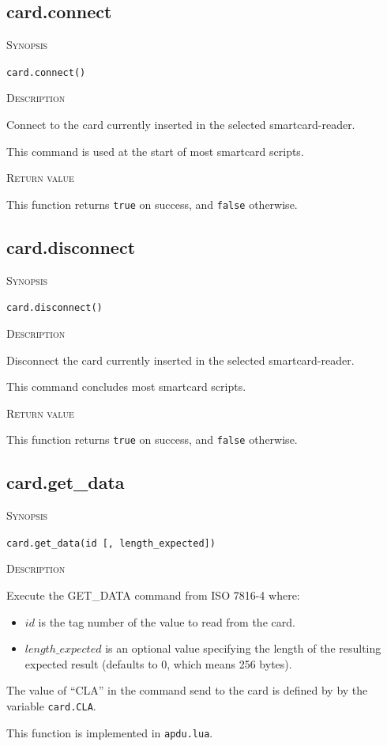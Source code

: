 \documentclass[11pt]{report}
\newcommand{\mansection}[1]{\vspace{0.5em}\par\noindent\textsc{#1}\vspace{0.5em}\par}
\begin{document}
\subsection{card.connect}

\mansection{Synopsis}
\texttt{card.connect()}

\mansection{Description}
  Connect to the card currently inserted in the selected smartcard-reader. 

  This command is used at the start of most smartcard scripts.

\mansection{Return value}
   This function returns \texttt{true} on success, and \texttt{false} otherwise.


\subsection{card.disconnect}

\mansection{Synopsis}
\texttt{card.disconnect()}

\mansection{Description}
  Disconnect the card currently inserted in the selected smartcard-reader.
	  
  This command concludes most smartcard scripts.

\mansection{Return value}
  This function returns \texttt{true} on success, and \texttt{false} otherwise.

\subsection{card.get\_data}

\mansection{Synopsis}
\texttt{card.get\_data(id [, length\_expected])}


\mansection{Description}
  Execute the GET\_DATA command from ISO 7816-4 where:
  \begin{itemize}
  \item{$id$ is the tag number of the value to read from the card.}
  \item{$length\_expected$ is an optional value specifying the length of the resulting expected result (defaults to 0, which means 256 bytes).}
  \end{itemize}

  The value of ``CLA'' in the command send to the card is defined by by the variable \texttt{card.CLA}.

  This function is implemented in \texttt{apdu.lua}.
\end{document}
